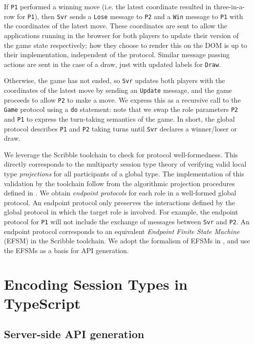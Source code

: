 \documentclass[submission,copyright,creativecommons]{eptcs}
\begin{document}
If \texttt{P1} performed a winning move (i.e. the latest coordinate resulted in three-in-a-row for \texttt{P1}), then \texttt{Svr} sends a \texttt{Lose} message to \texttt{P2} and a \texttt{Win} message to \texttt{P1} with the coordinates of the latest move. These coordinates are sent to allow the applications running in the browser for both players to update their version of the game state respectively; how they choose to render this on the DOM is up to their implementation, independent of the protocol. Similar message passing actions are sent in the case of a draw, just with updated labels for \texttt{Draw}. 

Otherwise, the game has not ended, so \texttt{Svr} updates both players with the coordinates of the latest move by sending an \texttt{Update} message, and the game proceeds to allow \texttt{P2} to make a move. We express this as a recursive call to the \texttt{Game} protocol using a \texttt{do} statement: note that we swap the role parameters \texttt{P2} and \texttt{P1} to express the turn-taking semantics of the game. In short, the global protocol describes \texttt{P1} and \texttt{P2} taking turns until \texttt{Svr} declares a winner/loser or draw.

We leverage the Scribble toolchain to check for protocol well-formedness. This directly corresponds to the multiparty session type theory of verifying valid local type \textit{projections} for all participants of a global type. The implementation of this validation by the toolchain follow from the algorithmic projection procedures defined in \cite{MPST}. We obtain \textit{endpoint protocols} for each role in a well-formed global protocol. An endpoint protocol only preserves the interactions defined by the global protocol in which the target role is involved. For example, the endpoint protocol for \texttt{P1} will not include the exchange of messages between \texttt{Svr} and \texttt{P2}. An endpoint protocol corresponds to an equivalent \textit{Endpoint Finite State Machine} (EFSM) in the Scribble toolchain. We adopt the formalism of EFSMs in \cite{Hybrid2016}, and use the EFSMs as a basis for API generation.


\section{Encoding Session Types in TypeScript}

\subsection{Server-side API generation}
\label{section:server}
\end{document}
